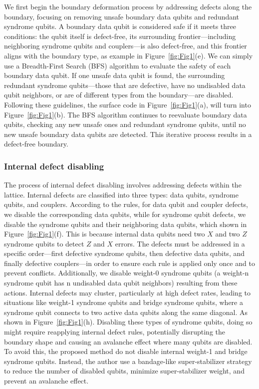 We first begin the boundary deformation process by addressing defects along the boundary, focusing on removing unsafe boundary data qubits and redundant syndrome qubits. A boundary data qubit is considered safe if it meets three conditions: the qubit itself is defect-free, its surrounding frontier—including neighboring syndrome qubits and couplers—is also defect-free, and this frontier aligns with the boundary type, as example in Figure~\ref{fig:Fig1}(e). We can simply use a Breadth-First Search (BFS) algorithm to evaluate the safety of each boundary data qubit. If one unsafe data qubit is found, the surrounding redundant syndrome qubits—those that are defective, have no undisabled data qubit neighbors, or are of different types from the boundary—are disabled. Following these guidelines, the surface code in Figure~\ref{fig:Fig1}(a), will turn into Figure~\ref{fig:Fig1}(b). The BFS algorithm continues to reevaluate boundary data qubits, checking any new unsafe ones and redundant syndrome qubits, until no new unsafe boundary data qubits are detected. This iterative process results in a defect-free boundary.




\subsubsection{Internal defect disabling}

The process of internal defect disabling involves addressing defects within the lattice. Internal defects are classified into three types: data qubits, syndrome qubits, and couplers. According to the rules, for data qubit and coupler defects, we disable the corresponding data qubits, while for syndrome qubit defects, we disable the syndrome qubits and their neighboring data qubits, which shown in Figure~\ref{fig:Fig1}(f). This is because internal data qubits need two $X$ and two $Z$ syndrome qubits to detect $Z$ and $X$ errors. The defects must be addressed in a specific order—first defective syndrome qubits, then defective data qubits, and finally defective couplers—in order to ensure each rule is applied only once and to prevent conflicts. Additionally, we disable weight-0 syndrome qubits (a weight-n syndrome qubit has n undisabled data qubit neighbors) resulting from these actions. Internal defects may cluster, particularly at high defect rates, leading to situations like weight-1 syndrome qubits and bridge syndrome qubits, where a syndrome qubit connects to two active data qubits along the same diagonal. As shown in Figure~\ref{fig:Fig1}(h). Disabling these types of syndrome qubits, doing so might require reapplying internal defect rules, potentially disrupting the boundary shape and causing an avalanche effect where many qubits are disabled. To avoid this, the proposed method do not disable internal weight-1 and bridge syndrome qubits. Instead, the author use a bandage-like super-stabilizer strategy to reduce the number of disabled qubits, minimize super-stabilizer weight, and prevent an avalanche effect. 

